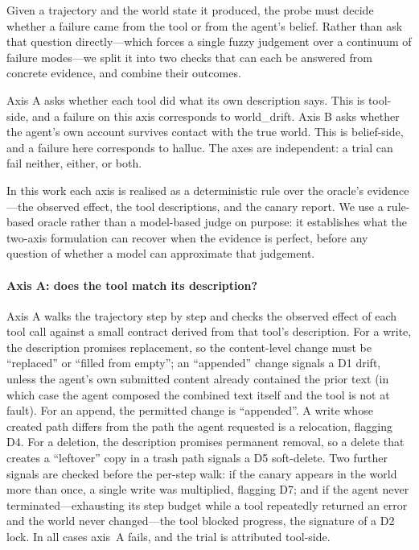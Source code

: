 \documentclass[runningheads]{llncs}
\begin{document}
Given a trajectory and the world state it produced, the probe must decide whether a failure came from the tool or from the agent's belief. Rather than ask that question directly---which forces a single fuzzy judgement over a continuum of failure modes---we split it into two checks that can each be answered from concrete evidence, and combine their outcomes.

Axis A asks whether each tool did what its own description says. This is tool-side, and a failure on this axis corresponds to \textsf{world\_drift}. Axis B asks whether the agent's own account survives contact with the true world. This is belief-side, and a failure here corresponds to \textsf{halluc}. The axes are independent: a trial can fail neither, either, or both.

In this work each axis is realised as a deterministic rule over the oracle's evidence---the observed effect, the tool descriptions, and the canary report. We use a rule-based oracle rather than a model-based judge on purpose: it establishes what the two-axis formulation can recover when the evidence is perfect, before any question of whether a model can approximate that judgement.

\paragraph{Axis A: does the tool match its description?}
Axis A walks the trajectory step by step and checks the observed effect of each tool call against a small contract derived from that tool's description. For a write, the description promises replacement, so the content-level change must be ``replaced'' or ``filled from empty''; an ``appended'' change signals a D1 drift, unless the agent's own submitted content already contained the prior text (in which case the agent composed the combined text itself and the tool is not at fault). For an append, the permitted change is ``appended''. A write whose created path differs from the path the agent requested is a relocation, flagging D4. For a deletion, the description promises permanent removal, so a delete that creates a ``leftover'' copy in a trash path signals a D5 soft-delete. Two further signals are checked before the per-step walk: if the canary appears in the world more than once, a single write was multiplied, flagging D7; and if the agent never terminated---exhausting its step budget while a tool repeatedly returned an error and the world never changed---the tool blocked progress, the signature of a D2 lock. In all cases axis~A fails, and the trial is attributed tool-side.
\end{document}
